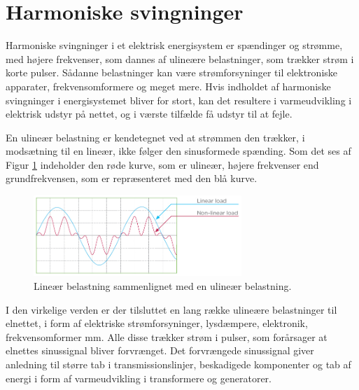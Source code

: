 
\section{Harmoniske svingninger}
Harmoniske svingninger i et elektrisk energisystem er spændinger og strømme, med højere frekvenser, som dannes af ulineære belastninger, som trækker strøm i korte pulser. Sådanne belastninger kan være strømforsyninger til elektroniske apparater, frekvensomformere og meget mere. Hvis indholdet af harmoniske svingninger i energisystemet bliver for stort, kan det resultere i varmeudvikling i elektrisk udstyr på nettet, og i værste tilfælde få udstyr til at fejle. \newline

En ulineær belastning er kendetegnet ved at strømmen den trækker, i modsætning til en lineær, ikke følger den sinusformede spænding.  Som det ses af Figur \ref{fig:nonLinear} indeholder den røde kurve, som er ulineær, højere frekvenser end grundfrekvensen, som er repræsenteret med den blå kurve. 


\begin{figure}[H] %
	\centering
	\includegraphics[width=0.7\textwidth]{figure/nonLinear}
	\caption{Lineær belastning sammenlignet med en ulineær belastning.}
	\label{fig:nonLinear}
\end{figure}

I den virkelige verden er der tilsluttet en lang række ulineære belastninger til elnettet, i form af elektriske strømforsyninger, lysdæmpere, elektronik, frekvensomformer mm. Alle disse trækker strøm i pulser, som forårsager at elnettes sinussignal bliver forvrænget. Det forvrængede sinussignal giver anledning til større tab i transmissionslinjer, beskadigede komponenter og tab af energi i form af varmeudvikling i transformere og generatorer. \newline

